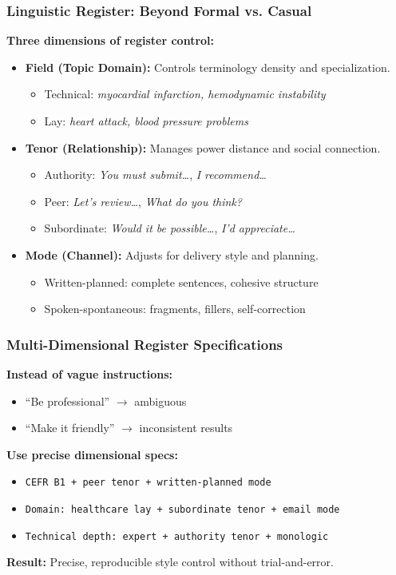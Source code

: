 \documentclass{beamer}
\begin{document}
\begin{frame}
    \frametitle{Linguistic Register: Beyond Formal vs. Casual}
    \textbf{Three dimensions of register control:}
    \begin{itemize}
        \item \textbf{Field (Topic Domain):} Controls terminology density and specialization.
        \begin{itemize}
            \item Technical: \emph{myocardial infarction, hemodynamic instability}
            \item Lay: \emph{heart attack, blood pressure problems}
        \end{itemize}
        \item \textbf{Tenor (Relationship):} Manages power distance and social connection.
        \begin{itemize}
            \item Authority: \emph{You must submit\ldots}, \emph{I recommend\ldots}
            \item Peer: \emph{Let's review\ldots}, \emph{What do you think?}
            \item Subordinate: \emph{Would it be possible\ldots}, \emph{I'd appreciate\ldots}
        \end{itemize}
        \item \textbf{Mode (Channel):} Adjusts for delivery style and planning.
        \begin{itemize}
            \item Written-planned: complete sentences, cohesive structure
            \item Spoken-spontaneous: fragments, fillers, self-correction
        \end{itemize}
    \end{itemize}
\end{frame}

\begin{frame}
    \frametitle{Multi-Dimensional Register Specifications}
    \textbf{Instead of vague instructions:}
    \begin{itemize}
        \item ``Be professional'' $\rightarrow$ ambiguous
        \item ``Make it friendly'' $\rightarrow$ inconsistent results
    \end{itemize}
    
    \vspace{0.3cm}
    \textbf{Use precise dimensional specs:}
    \begin{itemize}
        \item \texttt{CEFR B1 + peer tenor + written-planned mode}
        \item \texttt{Domain: healthcare lay + subordinate tenor + email mode}
        \item \texttt{Technical depth: expert + authority tenor + monologic}
    \end{itemize}
    
    \vspace{0.3cm}
    \textbf{Result:} Precise, reproducible style control without trial-and-error.
\end{frame}
\end{document}

